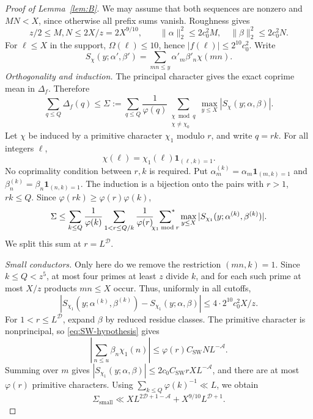 \documentclass{amsart}
\numberwithin{equation}{section}
\numberwithin{table}{section}
\newcommand{\ind}{\mathbf 1}
\newcommand{\sums}{\sideset{}{^*}\sum}
\begin{document}
\begin{proof}[Proof of Lemma~\ref{lem:B}]
We may assume that both sequences are nonzero and $MN<X$, since
otherwise all prefix sums vanish. Roughness gives
\begin{equation}\label{eq:B-support}
z/2\le M,N\le2X/z=2X^{9/10},\qquad
\|\alpha\|_2^2\le2c_0^2M,\quad\|\beta\|_2^2\le2c_0^2N.
\end{equation}
For $\ell\le X$ in the support, $\Omega(\ell)\le10$, hence
$|f(\ell)|\le2^{10}c_0^2$. Write
\[
S_\chi(y;\alpha',\beta')=\sum_{mn\le y}\alpha'_m\beta'_n\chi(mn).
\]
\noindent\textit{Orthogonality and induction.}
The principal character gives the exact coprime mean in $\Delta_f$.
Therefore
\begin{equation}\label{eq:B-orthogonality}
\sum_{q\le Q}\Delta_f(q)
\le\Sigma:=\sum_{q\le Q}\frac1{\varphi(q)}
\sum_{\substack{\chi\bmod q\\\chi\ne\chi_0}}
\max_{y\le X}|S_\chi(y;\alpha,\beta)|.
\end{equation}
Let $\chi$ be induced by a primitive character $\chi_1$ modulo $r$, and
write $q=rk$. For all integers $\ell$,
\[
\chi(\ell)=\chi_1(\ell)\ind_{(\ell,k)=1}.
\]
No coprimality condition between $r,k$ is required. Put $\alpha^{(k)}_m=\alpha_m\ind_{(m,k)=1}$ and
$\beta^{(k)}_n=\beta_n\ind_{(n,k)=1}$.
The induction is a bijection onto the pairs with $r>1$, $rk\le Q$.
Since $\varphi(rk)\ge\varphi(r)\varphi(k)$,
\begin{equation}\label{eq:B-induction}
\Sigma\le\sum_{k\le Q}\frac1{\varphi(k)}
\sum_{1<r\le Q/k}\frac1{\varphi(r)}\sums_{\chi_1\bmod r}
\max_{y\le X}|S_{\chi_1}(y;\alpha^{(k)},\beta^{(k)})|.
\end{equation}
We split this sum at $r=L^{\mathcal D}$.

\noindent\textit{Small conductors.}
Only here do we remove the restriction $(mn,k)=1$.
Since $k\le Q<z^5$, at most four primes at least $z$ divide $k$, and for
each such prime at most $X/z$ products $mn\le X$ occur.
Thus, uniformly in all cutoffs,
\[
\left|S_{\chi_1}(y;\alpha^{(k)},\beta^{(k)})
-S_{\chi_1}(y;\alpha,\beta)\right|
\le4\cdot2^{10}c_0^2X/z.
\]
For $1<r\le L^{\mathcal D}$, expand $\beta$ by reduced residue classes.
The primitive character is nonprincipal, so \eqref{eq:SW-hypothesis} gives
\[
\left|\sum_{n\le u}\beta_n\chi_1(n)\right|
\le\varphi(r)C_{\mathrm{SW}}NL^{-\mathcal A}.
\]
Summing over $m$ gives $|S_{\chi_1}(y;\alpha,\beta)|
\le2c_0C_{\mathrm{SW}}rXL^{-\mathcal A}$, and there are at most
$\varphi(r)$ primitive characters. Using $\sum_{k\le Q}\varphi(k)^{-1}\ll L$, we obtain
\begin{equation}\label{eq:B-small}
\Sigma_{\mathrm{small}}
\ll XL^{2\mathcal D+1-\mathcal A}+X^{9/10}L^{\mathcal D+1}.
\end{equation}


\end{proof}
\end{document}
